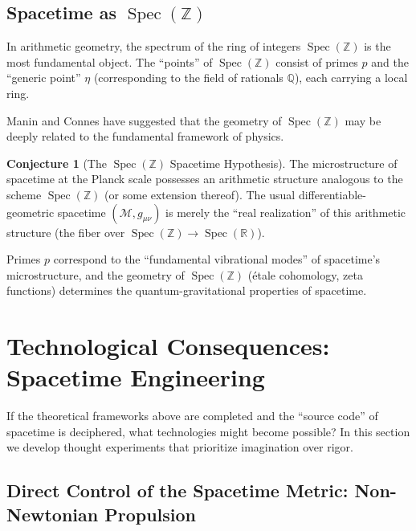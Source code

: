 \documentclass[12pt,a4paper]{article}
\theoremstyle{definition}
\newtheorem{conjecture}[definition]{Conjecture}
\newcommand{\Spec}{\operatorname{Spec}}
\begin{document}
\subsection{Spacetime as $\Spec(\mathbb{Z})$}

In arithmetic geometry, the spectrum of the ring of integers $\Spec(\mathbb{Z})$ is the most fundamental object. The ``points'' of $\Spec(\mathbb{Z})$ consist of primes $p$ and the ``generic point'' $\eta$ (corresponding to the field of rationals $\mathbb{Q}$), each carrying a local ring.

Manin \cite{Manin1995} and Connes \cite{Connes1999} have suggested that the geometry of $\Spec(\mathbb{Z})$ may be deeply related to the fundamental framework of physics.

\begin{conjecture}[The $\Spec(\mathbb{Z})$ Spacetime Hypothesis]
The microstructure of spacetime at the Planck scale possesses an arithmetic structure analogous to the scheme $\Spec(\mathbb{Z})$ (or some extension thereof). The usual differentiable-geometric spacetime $(\mathcal{M}, g_{\mu\nu})$ is merely the ``real realization'' of this arithmetic structure (the fiber over $\Spec(\mathbb{Z}) \to \Spec(\mathbb{R})$).

Primes $p$ correspond to the ``fundamental vibrational modes'' of spacetime's microstructure, and the geometry of $\Spec(\mathbb{Z})$ (\'etale cohomology, zeta functions) determines the quantum-gravitational properties of spacetime.
\end{conjecture}


\newpage
\section{Technological Consequences: Spacetime Engineering}
\label{sec:technology}

If the theoretical frameworks above are completed and the ``source code'' of spacetime is deciphered, what technologies might become possible? In this section we develop thought experiments that prioritize imagination over rigor.

\subsection{Direct Control of the Spacetime Metric: Non-Newtonian Propulsion}
\end{document}
